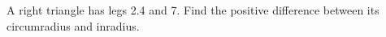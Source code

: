 A right triangle has legs 2.4 and 7. Find the positive difference between its circumradius and inradius.
